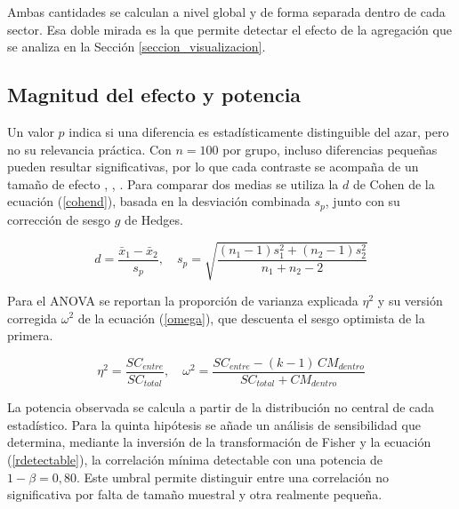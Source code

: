         Ambas cantidades se calculan a nivel global y de forma separada dentro de
        cada sector. Esa doble mirada es la que permite detectar el efecto de la
        agregación que se analiza en la Sección \ref{seccion_visualizacion}.

    \subsection{Magnitud del efecto y potencia}
        \label{subsec_efecto}
        Un valor $p$ indica si una diferencia es estadísticamente distinguible 
        del azar, pero no su relevancia práctica. Con $n=100$ por grupo, incluso 
        diferencias pequeñas pueden resultar significativas, por lo que cada 
        contraste se acompaña de un tamaño de efecto \cite{wasserstein2016asa}, 
        \cite{cohen1988statistical}, \cite{lakens2013calculating}. Para comparar 
        dos medias se utiliza la $d$ de Cohen de la ecuación (\ref{cohend}), 
        basada en la desviación combinada $s_p$, junto con su corrección de 
        sesgo $g$ de Hedges.

        \begin{equation}
            d = \frac{\bar{x}_1 - \bar{x}_2}{s_p}, \quad
            s_p = \sqrt{\frac{(n_1-1)s_1^2 + (n_2-1)s_2^2}{n_1 + n_2 - 2}}
            \label{cohend}
        \end{equation}

        Para el ANOVA se reportan la proporción de varianza explicada $\eta^2$ y
        su versión corregida $\omega^2$ de la ecuación (\ref{omega}), que
        descuenta el sesgo optimista de la primera.

        \begin{equation}
            \eta^2 = \frac{SC_{entre}}{SC_{total}}, \quad
            \omega^2 = \frac{SC_{entre} - (k-1)\,CM_{dentro}}
                            {SC_{total} + CM_{dentro}}
            \label{omega}
        \end{equation}

        La potencia observada se calcula a partir de la distribución no
        central de cada estadístico. Para la quinta hipótesis se añade un
        análisis de sensibilidad que determina, mediante la inversión de la
        transformación de Fisher y la ecuación (\ref{rdetectable}), la
        correlación mínima detectable con una potencia de $1-\beta=0{,}80$. Este
        umbral permite distinguir entre una correlación no significativa por
        falta de tamaño muestral y otra realmente pequeña.

